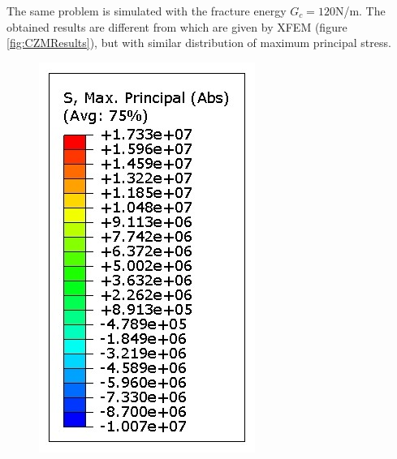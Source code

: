 \documentclass[preprint,review,12pt]{elsarticle}
\begin{document}
%
The same problem is simulated with the fracture energy $G_c=120$N/m. The obtained results are different from which are given by XFEM (figure \ref{fig:CZMResults}), but with similar distribution of maximum principal stress. 
\
\\
\begin{figure}[htbp]
\begin{minipage}[t]{0.28\textwidth}
\centering
\vspace{-2cm}
\includegraphics[width=\textwidth]{Abaqus/CZM/CZM_scale.jpg}

\end{minipage}
\end{figure}
\end{document}
